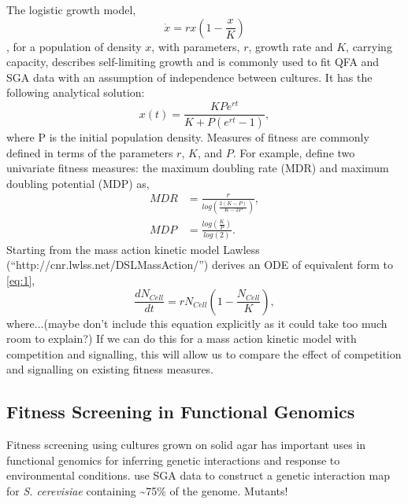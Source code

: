 \begin{multicols}{2}
The logistic growth model,
\begin{equation}
  \label{eq:1}
  \dot{x} = rx\left(1 - \frac{x}{K}\right)
\end{equation}
\citep{Verhulst1845}, for a population of density \(x\), with parameters, \(r\), growth
rate and \(K\), carrying capacity, describes self-limiting growth and is commonly used
to fit QFA and SGA data with an assumption of independence between cultures. It has the
following analytical solution:
\begin{equation}
  \label{eq:2}
  x(t) = \frac{KPe^{rt}}{K + P(e^{rt}-1)},
\end{equation}
where P is the initial population density. Measures of fitness are commonly defined in
terms of the parameters \(r\), \(K\), and \(P\). For example, \cite{Addinall2011} define two univariate
fitness measures: the maximum doubling rate (MDR) and maximum doubling potential (MDP) as,
\begin{subequations}
  \label{eq:3}
    \begin{align}
      MDR &= \frac{r}{log\left(\frac{2(K-P)}{K-2P}\right)},\\
      MDP &= \frac{log\left(\frac{K}{P}\right)}{log(2)}.
    \end{align}
\end{subequations}
Starting from the mass action kinetic model Lawless (``http://cnr.lwlss.net/DSLMassAction/'')
derives an ODE of equivalent form to \ref{eq:1},
\begin{equation}
  \label{eq:8}
  \frac{dN_{Cell}}{dt} = rN_{Cell}\left(1 - \frac{N_{Cell}}{K}\right),
\end{equation}
where...(maybe don't include this equation explicitly as it could take too much room to
explain?) If we can do this for a mass action kinetic model with competition and
signalling, this will allow us to compare the effect of competition and signalling on
existing fitness measures.

\subsection{Fitness Screening in Functional Genomics}
\label{sec:genetic-interaction}
Fitness screening using cultures grown on solid agar has important uses in functional
genomics for inferring genetic interactions and response to environmental
conditions. \citet{Costanzo2010} use SGA data to construct a genetic interaction map for
\textit{S. cerevisiae} containing \textasciitilde 75\% of the genome. Mutants!


\end{multicols}
